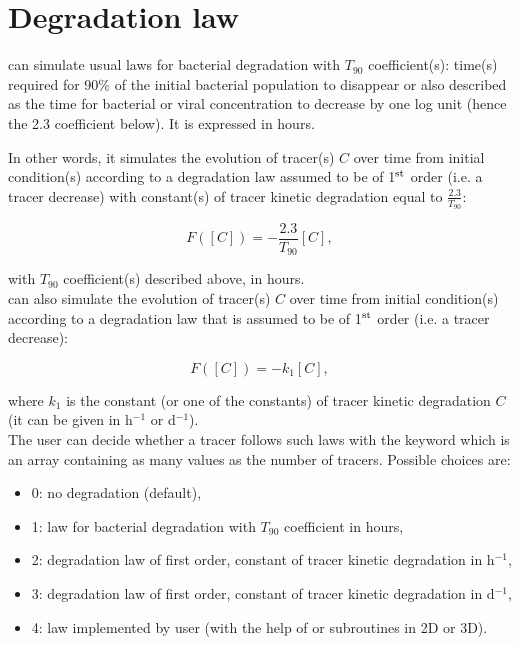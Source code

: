 \chapter{Degradation law}


\waqtel can simulate usual laws for bacterial degradation with
$T_{90}$ coefficient(s):
time(s) required for 90\% of the initial bacterial population to disappear
or also described as the time for bacterial or viral concentration to decrease
by one log unit (hence the 2.3 coefficient below).
It is expressed in hours.

In other words, it simulates the evolution of tracer(s) $C$ over time from
initial condition(s) according to a degradation law assumed to be of
1$^{\rm{st}}$ order (i.e. a tracer decrease) with constant(s) of tracer kinetic
degradation equal to $\frac{2.3}{T_{90}}$:

\begin{equation}
  F([C]) = -\frac{2.3}{T_{90}} [C],
\end{equation}

with $T_{90}$ coefficient(s) described above, in hours.
\\

\waqtel can also simulate the evolution of tracer(s) $C$ over time
from initial condition(s)
according to a degradation law that is assumed to be of 1$^{\rm{st}}$ order
(i.e. a tracer decrease):

\begin{equation}
  F([C]) = -k_1 [C],
\end{equation}

where $k_1$ is the constant (or one of the constants) of tracer kinetic
degradation $C$ (it can be given in h$^{-1}$ or d$^{-1}$).
\\

The user can decide whether a tracer follows such laws
with the keyword 
which is an array containing as many values as the number of tracers.
Possible choices are:
\begin{itemize}
\item 0: no degradation (default),
\item 1: law for bacterial degradation with $T_{90}$ coefficient
in hours,
\item 2: degradation law of first order, constant of tracer kinetic
degradation in h$^{-1}$,
\item 3: degradation law of first order, constant of tracer kinetic
degradation in d$^{-1}$,
\item 4: law implemented by user (with the help of
 or 
subroutines in 2D or 3D).
\end{itemize}

